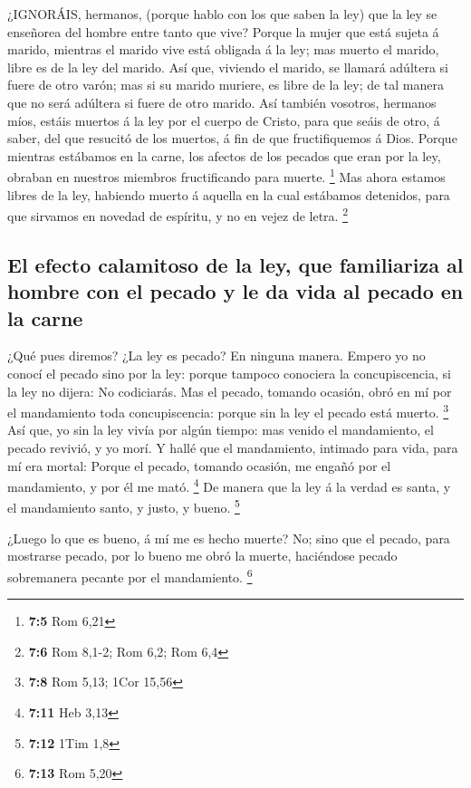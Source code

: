  ¿IGNORÁIS, hermanos, (porque hablo con los que saben la
ley) que la ley se enseñorea del hombre entre tanto que vive?
 Porque la mujer que está sujeta á marido, mientras el
marido vive está obligada á la ley; mas muerto el marido, libre es de la
ley del marido.  Así que, viviendo el marido, se llamará
adúltera si fuere de otro varón; mas si su marido muriere, es libre de
la ley; de tal manera que no será adúltera si fuere de otro marido.
 Así también vosotros, hermanos míos, estáis muertos á la
ley por el cuerpo de Cristo, para que seáis de otro, á saber, del que
resucitó de los muertos, á fin de que fructifiquemos á Dios.
 Porque mientras estábamos en la carne, los afectos de los
pecados que eran por la ley, obraban en nuestros miembros fructificando
para muerte. \footnote{\textbf{7:5} Rom 6,21}  Mas ahora
estamos libres de la ley, habiendo muerto á aquella en la cual estábamos
detenidos, para que sirvamos en novedad de espíritu, y no en vejez de
letra. \footnote{\textbf{7:6} Rom 8,1-2; Rom 6,2; Rom 6,4}

\hypertarget{el-efecto-calamitoso-de-la-ley-que-familiariza-al-hombre-con-el-pecado-y-le-da-vida-al-pecado-en-la-carne}{%
\subsection{El efecto calamitoso de la ley, que familiariza al hombre
con el pecado y le da vida al pecado en la
carne}\label{el-efecto-calamitoso-de-la-ley-que-familiariza-al-hombre-con-el-pecado-y-le-da-vida-al-pecado-en-la-carne}}

 ¿Qué pues diremos? ¿La ley es pecado? En ninguna manera.
Empero yo no conocí el pecado sino por la ley: porque tampoco conociera
la concupiscencia, si la ley no dijera: No codiciarás.  Mas
el pecado, tomando ocasión, obró en mí por el mandamiento toda
concupiscencia: porque sin la ley el pecado está muerto. \footnote{\textbf{7:8}
  Rom 5,13; 1Cor 15,56}  Así que, yo sin la ley vivía por
algún tiempo: mas venido el mandamiento, el pecado revivió, y yo morí.
 Y hallé que el mandamiento, intimado para vida, para mí
era mortal:  Porque el pecado, tomando ocasión, me engañó
por el mandamiento, y por él me mató. \footnote{\textbf{7:11} Heb 3,13}
 De manera que la ley á la verdad es santa, y el
mandamiento santo, y justo, y bueno. \footnote{\textbf{7:12} 1Tim 1,8}

 ¿Luego lo que es bueno, á mí me es hecho muerte? No; sino
que el pecado, para mostrarse pecado, por lo bueno me obró la muerte,
haciéndose pecado sobremanera pecante por el mandamiento. \footnote{\textbf{7:13}
  Rom 5,20}

